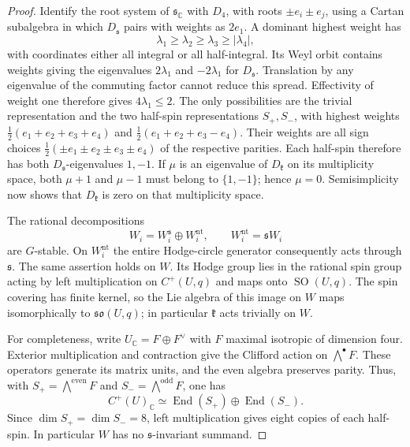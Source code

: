 \documentclass[11pt]{amsart}
\newcommand{\C}{\mathbb C}
\DeclareMathOperator{\End}{End}
\DeclareMathOperator{\SO}{SO}
\theoremstyle{definition}
\theoremstyle{remark}
\numberwithin{equation}{section}
\begin{document}
\begin{proof}
Identify the root system of $\mathfrak s_{\C}$ with $D_4$, with
roots $\pm e_i\pm e_j$, using a Cartan subalgebra in which
$D_{\mathfrak s}$ pairs with weights as $2e_1$.
A dominant highest weight has
\[
 \lambda_1\geq\lambda_2\geq\lambda_3\geq|\lambda_4|,
\]
with coordinates either all integral or all half-integral.  Its Weyl
orbit contains weights giving the eigenvalues
$2\lambda_1$ and $-2\lambda_1$ for $D_{\mathfrak s}$.  Translation by
any eigenvalue of the commuting factor cannot reduce this spread.
Effectivity of weight one therefore gives $4\lambda_1\leq2$.  The
only possibilities are the trivial representation and the two
half-spin representations $S_+,S_-$, with highest weights
$\tfrac12(e_1+e_2+e_3+e_4)$ and
$\tfrac12(e_1+e_2+e_3-e_4)$.  Their weights are all sign choices
$\tfrac12(\pm e_1\pm e_2\pm e_3\pm e_4)$ of the respective
parities.  Each half-spin therefore has both
$D_{\mathfrak s}$-eigenvalues $1,-1$.  If $\mu$ is an eigenvalue of
$D_{\mathfrak k}$ on its multiplicity space, both $\mu+1$ and
$\mu-1$ must belong to $\{1,-1\}$; hence $\mu=0$.
Semisimplicity now shows that $D_{\mathfrak k}$ is zero on that
multiplicity space.

The rational decompositions
\[
 W_i=W_i^{\mathfrak s}\oplus W_i^{\mathrm{nt}},
 \qquad W_i^{\mathrm{nt}}=\mathfrak s W_i
\]
are $G$-stable.  On $W_i^{\mathrm{nt}}$ the entire Hodge-circle
generator consequently acts through $\mathfrak s$.
The same assertion holds on $W$.  Its Hodge group lies in the
rational spin group acting by left multiplication on $C^+(U,q)$
and maps onto $\SO(U,q)$.  The spin covering has finite kernel,
so the Lie algebra of this image on $W$ maps isomorphically to
$\mathfrak{so}(U,q)$; in particular $\mathfrak k$ acts trivially
on $W$.

For completeness, write $U_\C=F\oplus F^\vee$ with $F$ maximal
isotropic of dimension four.  Exterior multiplication and contraction
give the Clifford action on $\bigwedge^\bullet F$.  These operators
generate its matrix units, and the even algebra preserves parity.
Thus, with $S_+=\bigwedge^{\mathrm{even}}F$ and
$S_-=\bigwedge^{\mathrm{odd}}F$, one has
\[
 C^+(U)_{\C}\simeq\End(S_+)\oplus\End(S_-).
\]
Since $\dim S_+=\dim S_-=8$, left multiplication gives eight
copies of each half-spin.
In particular $W$ has no $\mathfrak s$-invariant summand.


\end{proof}
\end{document}
